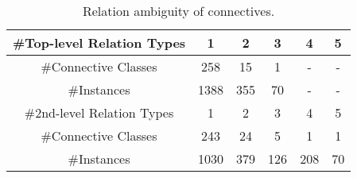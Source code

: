 \begin{table}[ht]
\centering
\begin{tabular}{|c|c|c|c|c|c|}
\hline
\#Top-level Relation Types & 1    & 2   & 3   & 4   & 5  \\ \hline
\#Connective Classes       & 258  & 15  & 1   & -   & -  \\ \hline
\#Instances                & 1388 & 355 & 70  & -   & -  \\

\hhline{|=|=|=|=|=|=|}

\#2nd-level Relation Types & 1    & 2   & 3   & 4   & 5  \\ \hline
\#Connective Classes       & 243  & 24  & 5   & 1   & 1  \\ \hline
\#Instances                & 1030 & 379 & 126 & 208 & 70 \\ \hline

\end{tabular}
\caption{\label{t:connective-type} Relation ambiguity of connectives. }
\end{table}
